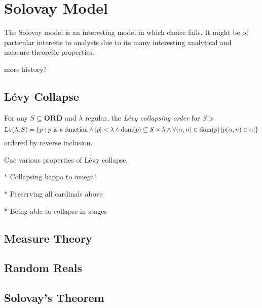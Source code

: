 \chapter{Solovay Model}

The Solovay model is an interesting model in which choice fails.
It might be of particular interests to analysts due to its many interesting analytical and measure-theoretic properties.

more history?

\section{Lévy Collapse}


\newcommand*{\Lv}{\operatorname{Lv}}
\begin{definition}
    For any \(S\subseteq \mathbf{ORD}\) and \(\lambda\) regular, the \emph{Lévy collapsing order} for \(S\) is
    \[
        \Lv(\lambda, S) = \set{p: p\text{ is a function} \land \abs{p} < \lambda \land \dom(p) \subseteq S\times\lambda
        \land \forall (\alpha,n)\in\dom(p)\sq{p(\alpha,n)\in \alpha}}
    \]
    ordered by reverse inclusion.
\end{definition}

Cue various properties of Lévy collapse.

* Collapsing kappa to omega1

* Preserving all cardinals above

* Being able to collapse in stages


\section{Measure Theory}

\section{Random Reals}

\section{Solovay's Theorem}
